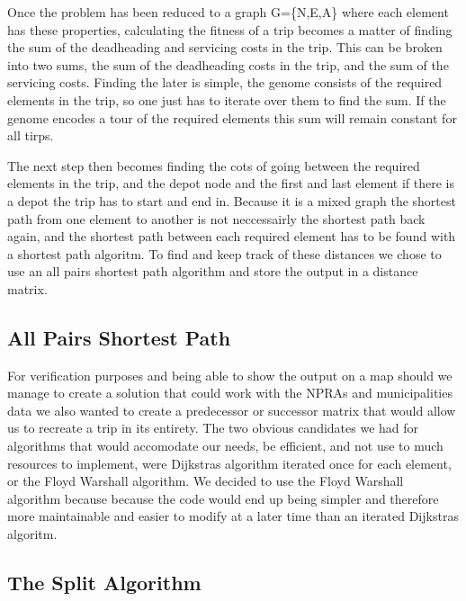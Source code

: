Once the problem has been reduced to a graph G=\{N,E,A\} where each element has these properties, calculating the fitness of a trip becomes a matter of finding the sum of the deadheading and servicing costs in the trip. This can be broken into two sums, the sum of the deadheading costs in the trip, and the sum of the servicing costs. Finding the later is simple, the genome consists of the required elements in the trip, so one just has to iterate over them to find the sum. If the genome encodes a tour of the required elements this sum will remain constant for all tirps.

The next step then becomes finding the cots of going between the required elements in the trip, and the depot node and the first and last element if there is a depot the trip has to start and end in. Because it is a mixed graph the shortest path from one element to another is not neccessairly the shortest path back again, and the shortest path between each required element has to be found with a shortest path algoritm. To find and keep track of these distances we chose to use an all pairs shortest path algorithm and store the output in a distance matrix.


\subsection{All Pairs Shortest Path} %
\label{sub:all_pairs_shortest_path}

For verification purposes and being able to show the output on a map should we manage to create a solution that could work with the NPRAs and municipalities data we also wanted to create a predecessor or successor matrix that would allow us to recreate a trip in its entirety. The two obvious candidates we had for algorithms that would accomodate our needs, be efficient, and not use to much resources to implement, were Dijkstras algorithm iterated once for each element, or the Floyd Warshall algorithm. We decided to use the Floyd Warshall algorithm because because the code would end up being simpler and therefore more maintainable and easier to modify at a later time than an iterated Dijkstras algoritm.




\subsection{The Split Algorithm} %
\label{sub:the_split_algorithm}


\cleardoublepage